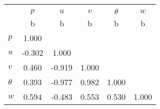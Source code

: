 \begin{tabular}{l*{5}{c}}
\toprule
                &\multicolumn{5}{c}{}                             \\
                &    $ p $&    $ u $&    $ v $&$ \theta $&    $ w $\\
                &        b&        b&        b&        b&        b\\
\midrule
$ p $           &    1.000&         &         &         &         \\
$ u $           &   -0.302&    1.000&         &         &         \\
$ v $           &    0.460&   -0.919&    1.000&         &         \\
$ \theta $      &    0.393&   -0.977&    0.982&    1.000&         \\
$ w $           &    0.594&   -0.483&    0.553&    0.530&    1.000\\
\bottomrule
\end{tabular}
